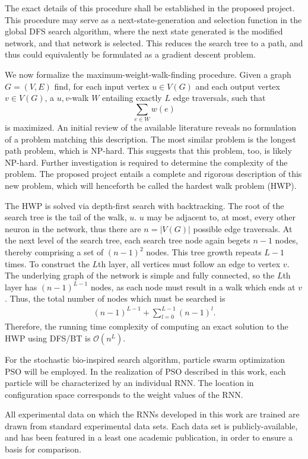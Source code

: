 \documentclass[12pt]{article}
\begin{document}
	 The exact details of this procedure shall be established in the proposed project. This procedure may serve as a next-state-generation and selection function in the global DFS search algorithm, where the next state generated is the modified network, and that network is selected. This reduces the search tree to a path, and thus could equivalently be formulated as a gradient descent problem. 
	
	We now formalize the maximum-weight-walk-finding procedure. Given a graph $G=(V,E)$ find, for each input vertex $u\in V(G)$ and each output vertex $v\in V(G)$, a $u,v$-walk $W$ entailing exactly $L$ edge traversals, such that $$\sum_{e\in W} w(e)$$ is maximized. An initial review of the available literature reveals no formulation of a problem matching this description. The most similar problem is the longest path problem, which is NP-hard. This suggests that this problem, too, is likely NP-hard. Further investigation is required to determine the complexity of the problem. The proposed project entails a complete and rigorous description of this new problem, which will henceforth be called the hardest walk problem (HWP).
	
	The HWP is solved via depth-first search with backtracking. The root of the search tree is the tail of the walk, $u$. $u$ may be adjacent to, at most, every other neuron in the network, thus there are $n=|V(G)|$ possible edge traversals. At the next level of the search tree, each search tree node again begets $n-1$ nodes, thereby comprising a set of $(n-1)^2$ nodes. This tree growth repeats $L-1$ times. To construct the $L$th layer, all vertices must follow an edge to vertex $v$. The underlying graph of the network is simple and fully connected, so the $L$th layer has $(n-1)^{L-1}$ nodes, as each node must result in a walk which ends at $v$. Thus, the total number of nodes which must be searched is 
	\begin{align}
	(n-1)^{L-1} +\sum_{l=0}^{L-1} (n-1)^{l}.
	\end{align}	
	\noindent Therefore, the running time complexity of computing an exact solution to the HWP using DFS/BT is $\mathcal{O}(n^L)$.
	
	For the stochastic bio-inspired search algorithm, particle swarm optimization PSO will be employed. In the realization of PSO described in this work, each particle will be characterized by an individual RNN. The location in configuration space corresponds to the weight values of the RNN.
	
	All experimental data on which the RNNs developed in this work are trained are drawn from standard experimental data sets. Each data set is publicly-available, and has been featured in a least one academic publication, in order to ensure a basis for comparison.
	
	
	
	

	
	
	
\end{document}
